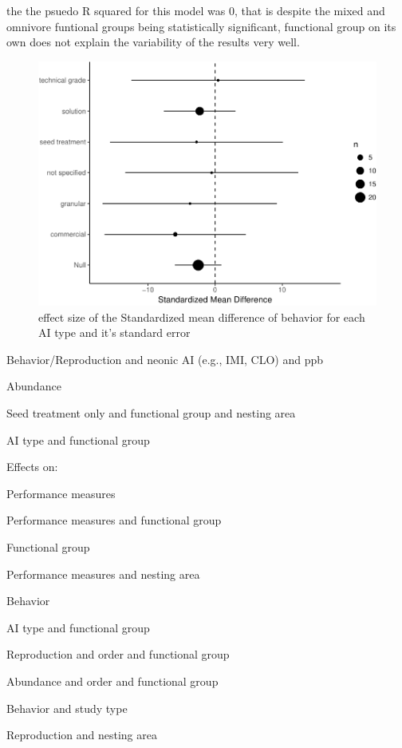 \documentclass[]{elsarticle} %
\makeatletter
\def\maxwidth{\ifdim\Gin@nat@width>\linewidth\linewidth
\else\Gin@nat@width\fi}
\let\Oldincludegraphics\includegraphics
\renewcommand{\includegraphics}[1]{\Oldincludegraphics[width=\maxwidth]{#1}}
\makeatother
\begin{document}
the the psuedo R squared for this model was 0, that is despite the mixed
and omnivore funtional groups being statistically significant,
functional group on its own does not explain the variability of the
results very well.

\begin{figure}[htbp]
\centering
\includegraphics{MetanalysisNeonics_files/figure-latex/unnamed-chunk-16-1.pdf}
\caption{effect size of the Standardized mean difference of behavior for
each AI type and it's standard error}
\end{figure}

Behavior/Reproduction and neonic AI (e.g., IMI, CLO) and ppb

Abundance

Seed treatment only and functional group and nesting area

AI type and functional group

Effects on:

Performance measures

Performance measures and functional group

Functional group

Performance measures and nesting area

Behavior

AI type and functional group

Reproduction and order and functional group

Abundance and order and functional group

Behavior and study type

Reproduction and nesting area
\end{document}
